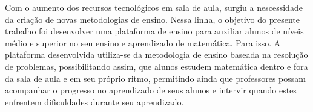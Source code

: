Com o aumento dos recursos tecnológicos em sala de aula, surgiu a nescessidade da criação de novas metodologias de ensino. Nessa linha, o objetivo do presente trabalho foi desenvolver uma plataforma de ensino para auxiliar alunos de níveis médio e superior no seu ensino e aprendizado de matemática. Para isso. A plataforma desenvolvida utiliza-se da metodologia de ensino baseada na resolução de problemas, possibilitando assim, que alunos estudem matemática dentro e fora da sala de aula e em seu próprio ritmo, permitindo ainda que professores possam acompanhar o progresso no aprendizado de seus alunos e intervir quando estes enfrentem dificuldades durante seu aprendizado. 


